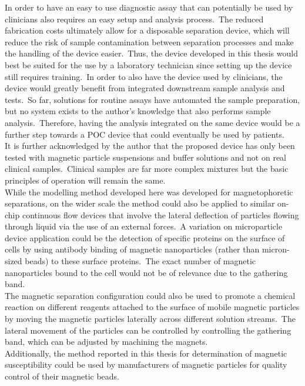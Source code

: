 In order to have an easy to use diagnostic assay that can potentially be used by clinicians also requires an easy setup and analysis process.\ The reduced fabrication costs ultimately allow for a disposable separation device, which will reduce the risk of sample contamination between separation processes and make the handling of the device easier.\ Thus, the device developed in this thesis would best be suited for the use by a laboratory technician since setting up the device still requires training.\ In order to also have the device used by clinicians, the device would greatly benefit from integrated downstream sample analysis and tests.\ So far, solutions for routine assays have automated the sample preparation, but no system exists to the author's knowledge that also performs sample analysis.\ Therefore, having the analysis integrated on the same device would be a further step towards a POC device that could eventually be used by patients.\\
It is further acknowledged by the author that the proposed device has only been tested with magnetic particle suspensions and buffer solutions and not on real clinical samples.\ Clinical samples are far more complex mixtures but the basic principles of operation will remain the same.\\
While the modelling method developed here was developed for magnetophoretic separations, on the wider scale the method could also be applied to similar on-chip continuous flow devices that involve the lateral deflection of particles flowing through liquid via the use of an external forces.\ A variation on microparticle device application could be the detection of specific proteins on the surface of cells by using antibody binding of magnetic nanoparticles (rather than micron-sized beads) to these surface proteins.\ The exact number of magnetic nanoparticles bound to the cell would not be of relevance due to the gathering band.\\
The magnetic separation configuration could also be used to promote a chemical reaction on different reagents attached to the surface of mobile magnetic particles by moving the magnetic particles laterally across different solution streams.\ The lateral movement of the particles can be controlled by controlling the gathering band, which can be adjusted by machining the magnets.\\
Additionally, the method reported in this thesis for determination of magnetic susceptibility could be used by manufacturers of magnetic particles for quality control of their magnetic beads.\\

